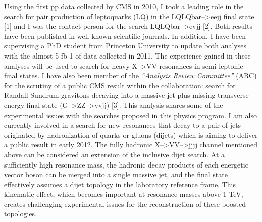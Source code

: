 \documentclass[10pt, a4paper]{article}
\begin{document}
Using the first pp data collected by CMS in 2010, I took a leading role 
in the search for pair production of leptoquarks (LQ) in the LQLQbar-->eejj final state [1] and 
I was the contact person for the search LQLQbar-->evjj [2]. 
Both results have been published in 
well-known scientific journals. In addition, I have been supervising 
a PhD student from Princeton University to update both analyses with 
the almost 5 fb-1 of data collected in 2011. The experience gained in these 
analyses will be used to search for heavy X-->VV resonances in semi-leptonic final states.
I have also been member of the {\it``Analysis Review Committee''} (ARC) for the scrutiny of a public CMS result within the collaboration: search for Randall-Sundrum gravitons decaying into 
a massive jet plus missing transverse energy final state (G-->ZZ-->vvjj) [3]. This analysis 
shares some of the experimental issues with the searches proposed in this physics program. 
I am also currently involved in a search for new resonances that decay to a pair 
of jets originated by hadronization of quarks or gluons (dijets) which is 
aiming to deliver a public result in early 2012. 
The fully hadronic X-->VV-->jjjj channel mentioned above 
can be considered an extension of the inclusive dijet search. 
At a sufficiently high resonance mass, the hadronic decay products of each energetic 
vector boson can be merged into a single massive jet, and the 
final state effectively assumes a dijet topology in the laboratory reference frame. 
This kinematic effect, which becomes important at resonance masses above 1 TeV, 
creates challenging  experimental issues for the reconstruction 
of these boosted topologies. \\
\end{document}
